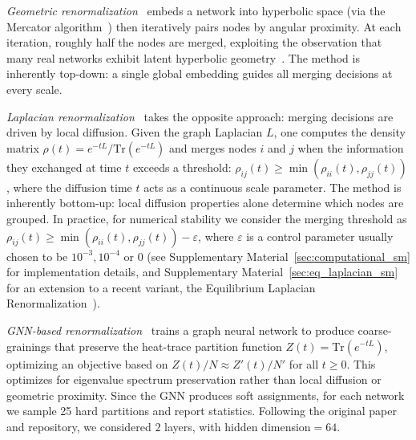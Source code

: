 \documentclass[twocolumn,superscriptaddress,tightenlines,aps,prx,floatfix]{revtex4-2}
\begin{document}
\begin{bibunit}
\emph{Geometric renormalization}~\cite{Multiscale_unfolding_of_real_nets_geometric_renorm_2018} embeds a network into hyperbolic space (via the Mercator algorithm~\cite{Mercator, D_Mercator}) then iteratively pairs nodes by angular proximity. 
At each iteration, roughly half the nodes are merged, exploiting the observation that many real networks exhibit latent hyperbolic geometry~\cite{Hyperbolic_geometry_complex_networks,Self_similarity_brain,Barjuan2025Multiscale}. 
The method is inherently top-down: a single global embedding guides all merging decisions at every scale.


\emph{Laplacian renormalization}~\cite{Villegas_Laplacian_renorm_heterogeneous_2023,nurisso2025higher} takes the opposite approach: merging decisions are driven by local diffusion. 
Given the graph Laplacian $L$, one computes the density matrix $\rho(t) = e^{-tL}/\mathrm{Tr}(e^{-tL})$ and merges nodes $i$ and $j$ when the information they exchanged at time $t$ exceeds a threshold: $\rho_{ij}(t) \geq \min(\rho_{ii}(t), \rho_{jj}(t))$, where the diffusion time $t$ acts as a continuous scale parameter. 
The method is inherently bottom-up: local diffusion properties alone determine which nodes are grouped. 
In practice, for numerical stability we consider the merging threshold as $\rho_{ij}(t) \geq \min(\rho_{ii}(t), \rho_{jj}(t))-\varepsilon$, where $\varepsilon$ is a control parameter usually chosen to be $10^{-3}, 10^{-4} \text{ or }0$ (see  Supplementary Material~\ref{sec:computational_sm} for implementation details, and Supplementary Material~\ref{sec:eq_laplacian_sm} for an extension to a recent variant, the Equilibrium Laplacian Renormalization~\cite{yi2025equilibriumpreservinglaplacianrenormalizationgroup}).


\emph{GNN-based renormalization}~\cite{Coarse_graining_network_De_Domenico} trains a graph neural network to produce coarse-grainings that preserve the heat-trace partition function $Z(t) = \mathrm{Tr}(e^{-tL})$, optimizing an objective based on $Z(t)/N \approx Z'(t)/N'$ for all $t \geq 0$. 
This optimizes for eigenvalue spectrum preservation rather than local diffusion or geometric proximity. Since the GNN produces soft assignments, for each network we sample 25 hard partitions and report statistics. Following the original paper and repository, we considered $2$ layers, with hidden dimension$= 64$.


\end{bibunit}
\end{document}
